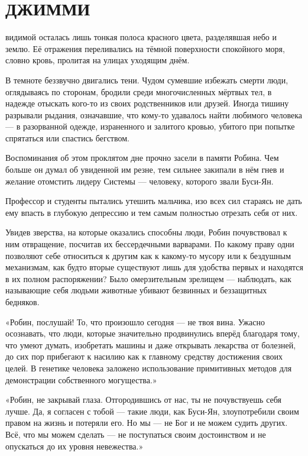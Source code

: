 \documentclass[a4paper,12pt]{book}
\begin{document}
\chapter{ДЖИММИ}
\noindent{} видимой осталась лишь тонкая полоса красного цвета, разделявшая небо и землю. Её отражения переливались на тёмной поверхности спокойного моря, словно кровь, пролитая на улицах уходящим днём.
\par
В темноте беззвучно двигались тени. Чудом сумевшие избежать смерти люди, оглядываясь по сторонам, бродили среди многочисленных мёртвых тел, в надежде отыскать кого-то из своих родственников или друзей. Иногда тишину разрывали рыдания, означавшие, что кому-то удавалось найти любимого человека — в разорванной одежде, израненного и залитого кровью, убитого при попытке спрятаться или спастись бегством.
\par
Воспоминания об этом проклятом дне прочно засели в памяти Робина. Чем больше он думал об увиденной им резне, тем сильнее закипали в нём гнев и желание отомстить лидеру Системы — человеку, которого звали Буси-Ян.
\par
Профессор и студенты пытались утешить мальчика, изо всех сил стараясь не дать ему впасть в глубокую депрессию и тем самым полностью отрезать себя от них.
\par
Увидев зверства, на которые оказались способны люди, Робин почувствовал к ним отвращение, посчитав их бессердечными варварами. По какому праву одни позволяют себе относиться к другим как к какому-то мусору или к бездушным механизмам, как будто вторые существуют лишь для удобства первых и находятся в их полном распоряжении? Было омерзительным зрелищем — наблюдать, как называющие себя людьми животные убивают 
безвинных и беззащитных бедняков.\\
\par
«Робин, послушай! То, что произошло сегодня — не твоя вина. Ужасно осознавать, что люди, которые значительно продвинулись вперёд благодаря тому, что умеют думать, изобретать машины и даже открывать лекарства от болезней, до сих пор прибегают к насилию как к главному средству достижения своих целей. В генетике человека заложено использование примитивных методов для демонстрации собственного могущества.»
\par
«Робин, не закрывай глаза. Отгородившись от нас, ты не почувствуешь себя лучше. Да, я согласен с тобой — такие люди, как Буси-Ян, злоупотребили своим правом на жизнь и потеряли его. Но мы — не Бог и не можем судить других. Всё, что мы можем сделать — не поступаться своим достоинством и не опускаться до их уровня невежества.»
\end{document}
